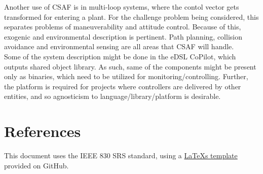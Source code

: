 Another use of CSAF is in multi-loop systems, where the contol vector gets transformed for entering a plant. For the challenge problem being considered, this separates problems of maneuverability and attitude control. Because of this, exogenic and environmental description is pertinent. Path planning, collision avoidance and environmental sensing are all areas that CSAF will handle.\\

Some of the system description might be done in the eDSL CoPilot, which outputs shared object library. As such, same of the components might be present only as binaries, which need to be utilized for monitoring/controlling. Further, the platform is required for projects where controllers are delivered by other entities, and so agnosticism to language/library/platform is desirable. 

\section{References}

This document uses the IEEE 830 SRS standard, using a \href{https://github.com/jpeisenbarth/SRS-Tex}{\LaTeX{}s template} provided on GitHub.  \\
